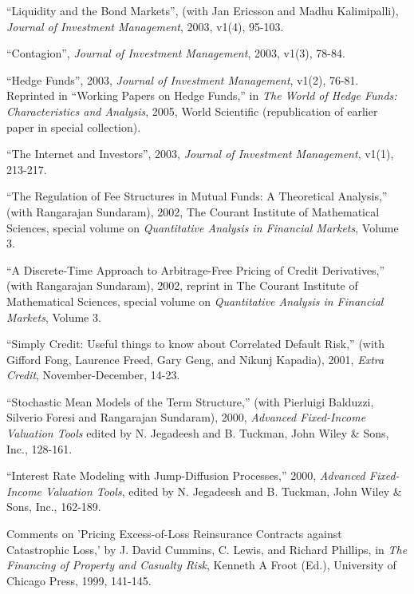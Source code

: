 \documentclass{article}
\begin{document}
\begin{etaremune}
\item ``Liquidity and the Bond Markets'', (with Jan
Ericsson and Madhu Kalimipalli), {\it Journal of
Investment Management}, 2003, v1(4), 95-103.

\item ``Contagion'', {\it Journal of
Investment Management}, 2003, v1(3), 78-84.

\item ``Hedge Funds'', 2003, {\it Journal of
Investment Management}, v1(2), 76-81. Reprinted in
``Working Papers on Hedge Funds,'' in 
{\it The World of Hedge Funds: Characteristics and Analysis}, 
2005, World Scientific (republication of earlier paper in special
collection). 

\item ``The Internet and Investors'', 2003, {\it Journal 
of Investment Management}, v1(1), 213-217.

\item ``The Regulation of Fee Structures in Mutual Funds: A
Theoretical Analysis,'' (with Rangarajan Sundaram), 2002, 
The Courant Institute of Mathematical
Sciences, special volume on {\it Quantitative Analysis in Financial
Markets}, Volume 3. 

\item 
``A Discrete-Time Approach to Arbitrage-Free Pricing of Credit
Derivatives,'' (with Rangarajan Sundaram), 2002,
reprint in The Courant Institute of Mathematical
Sciences, special volume on {\it Quantitative Analysis in Financial
Markets}, Volume 3. 

\item ``Simply Credit: Useful things to know about Correlated
Default Risk,'' (with Gifford Fong, Laurence Freed, Gary Geng, and
Nikunj Kapadia), 2001, {\it Extra Credit}, November-December, 14-23.

\item
``Stochastic Mean Models of the Term Structure,''
(with Pierluigi Balduzzi, Silverio Foresi and Rangarajan Sundaram), 
2000, {\it Advanced Fixed-Income Valuation Tools}
edited by N. Jegadeesh and B. Tuckman,
John Wiley \& Sons, Inc., 128-161.

\item
``Interest Rate Modeling with Jump-Diffusion Processes,'' 2000,
{\it Advanced Fixed-Income Valuation Tools}, edited by
N. Jegadeesh and B. Tuckman, John Wiley \& Sons, Inc., 162-189.

\item
Comments on 'Pricing Excess-of-Loss Reinsurance Contracts against
Catastrophic Loss,' by J. David Cummins, C. Lewis, and Richard Phillips,
in {\it The Financing of Property and Casualty Risk}, Kenneth A
Froot (Ed.), University of Chicago Press, 1999, 141-145. 


\end{etaremune}
\end{document}
